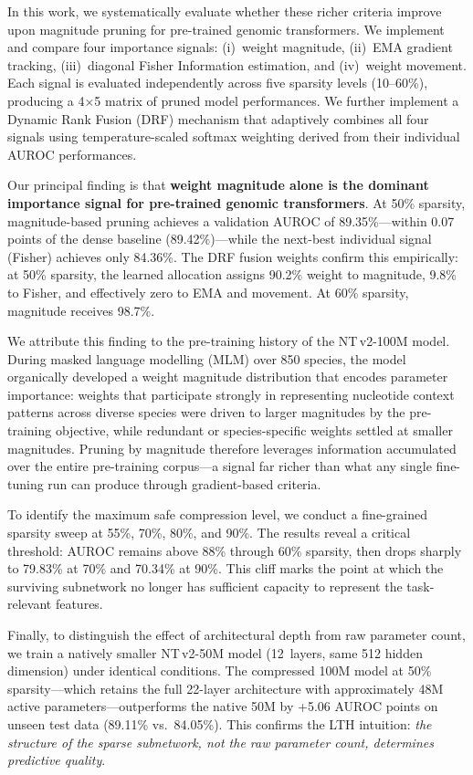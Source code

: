 \documentclass[journal]{IEEEtran}
\newcommand{\ntv}{NT\,v2-100M}
\newcommand{\ntvsmall}{NT\,v2-50M}
\begin{document}
In this work, we systematically evaluate whether these richer
criteria improve upon magnitude pruning for pre-trained genomic
transformers.
We implement and compare four importance signals:
(i)~weight magnitude,
(ii)~EMA gradient tracking,
(iii)~diagonal Fisher Information estimation, and
(iv)~weight movement.
Each signal is evaluated independently across five sparsity
levels (10--60\%), producing a 4$\times$5 matrix of pruned
model performances.
We further implement a Dynamic Rank Fusion (DRF) mechanism
that adaptively combines all four signals using
temperature-scaled softmax weighting derived from their
individual AUROC performances.

Our principal finding is that \textbf{weight magnitude alone
is the dominant importance signal for pre-trained genomic
transformers}.
At 50\% sparsity, magnitude-based pruning achieves a validation
AUROC of 89.35\%---within 0.07 points of the dense baseline
(89.42\%)---while the next-best individual signal (Fisher)
achieves only 84.36\%.
The DRF fusion weights confirm this empirically: at 50\%
sparsity, the learned allocation assigns 90.2\% weight to
magnitude, 9.8\% to Fisher, and effectively zero to EMA and
movement.
At 60\% sparsity, magnitude receives 98.7\%.

We attribute this finding to the pre-training history of the
\ntv{} model.
During masked language modelling (MLM) over 850 species, the
model organically developed a weight magnitude distribution
that encodes parameter importance: weights that participate
strongly in representing nucleotide context patterns across
diverse species were driven to larger magnitudes by the
pre-training objective, while redundant or
species-specific weights settled at smaller magnitudes.
Pruning by magnitude therefore leverages information accumulated
over the entire pre-training corpus---a signal far richer than
what any single fine-tuning run can produce through
gradient-based criteria.

To identify the maximum safe compression level, we conduct a
fine-grained sparsity sweep at 55\%, 70\%, 80\%, and 90\%.
The results reveal a critical threshold: AUROC remains above
88\% through 60\% sparsity, then drops sharply to 79.83\% at
70\% and 70.34\% at 90\%.
This cliff marks the point at which the surviving subnetwork
no longer has sufficient capacity to represent the
task-relevant features.

Finally, to distinguish the effect of architectural depth from
raw parameter count, we train a natively smaller \ntvsmall{}
model (12~layers, same 512 hidden dimension) under identical
conditions.
The compressed 100M model at 50\% sparsity---which retains the
full 22-layer architecture with approximately 48M active
parameters---outperforms the native 50M by +5.06 AUROC points
on unseen test data (89.11\% vs.\ 84.05\%).
This confirms the LTH intuition: \emph{the structure of the
sparse subnetwork, not the raw parameter count, determines
predictive quality}.
\end{document}
